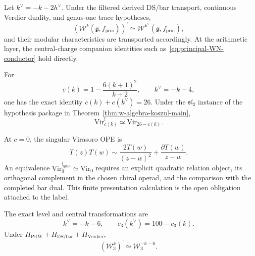 \begin{theorem}
\label{thm:w-algebra-koszul-main}
Let $k^\vee=-k-2h^\vee$.  Under the filtered derived DS/bar
transport, continuous Verdier duality, and genus-one trace
hypotheses,
\begin{equation}\label{eq:w-koszul-main-repaired}
(\mathcal W^k(\mathfrak g,f_{\mathrm{prin}}))^!
\simeq
\mathcal W^{k^\vee}(\mathfrak g,f_{\mathrm{prin}}),
\end{equation}
and their modular characteristics are transported accordingly.  At
the arithmetic layer, the central-charge companion identities such
as~\eqref{eq:principal-WN-conductor} hold directly.
\end{theorem}

\begin{proposition}
\label{prop:virasoro-generic-koszul-dual}
For
\[
c(k)=1-\frac{6(k+1)^2}{k+2},\qquad k^\vee=-k-4,
\]
one has the exact identity $c(k)+c(k^\vee)=26$.  Under the
$\mathfrak{sl}_2$ instance of the hypothesis package in
Theorem~\ref{thm:w-algebra-koszul-main},
\begin{equation}\label{eq:vir-companion-repaired}
\mathrm{Vir}_{c(k)}^!\simeq\mathrm{Vir}_{26-c(k)}.
\end{equation}
\end{proposition}

\begin{theorem}
\label{thm:virasoro-self-duality}
At $c=0$, the singular Virasoro OPE is
\[
T(z)T(w)\sim\frac{2T(w)}{(z-w)^2}
+\frac{\partial T(w)}{z-w}.
\]
An equivalence
$\mathrm{Vir}_0^{!_{\mathrm{quad}}}\simeq\mathrm{Vir}_0$ requires an
explicit quadratic relation object, its orthogonal complement in the
chosen chiral operad, and the comparison with the completed bar dual.
This finite presentation calculation is the open obligation attached
to the label.
\end{theorem}

\begin{theorem}
\label{thm:w3-koszul-dual}
The exact level and central transformations are
\[
k^\vee=-k-6,\qquad c_3(k^\vee)=100-c_3(k).
\]
Under $H_{\mathrm{PBW}}+H_{\mathrm{DS/bar}}+H_{\mathrm{Verdier}}$,
\[
(\mathcal W_3^k)^!\simeq\mathcal W_3^{-k-6}.
\]
\end{theorem}

